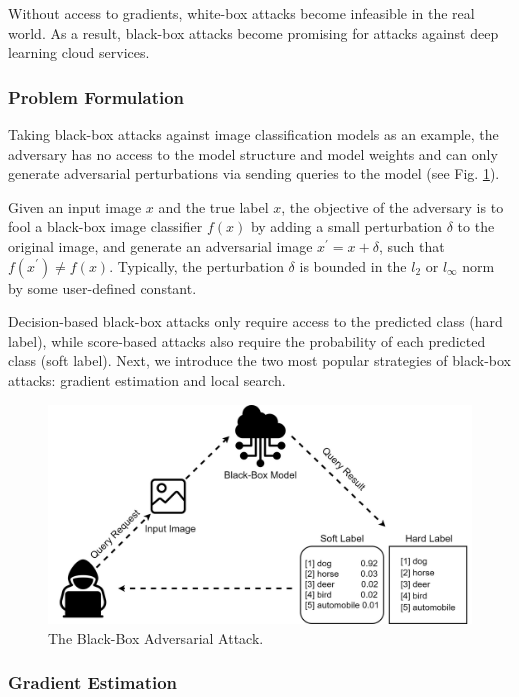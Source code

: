 Without access to gradients, white-box attacks become infeasible in the real world. As a result, black-box attacks become promising for attacks against deep learning cloud services.


\subsubsection{Problem Formulation}

Taking black-box attacks against image classification models as an example, the adversary has no access to the model structure and model weights and can only generate adversarial perturbations via sending queries to the model (see Fig. \ref{fig.decision}).
 
Given an input image $x$ and the true label $x$, the objective of the adversary is to fool a black-box image classifier $f(x)$ by adding a small perturbation $\delta$ to the original image, and generate an adversarial image $x^{'} = x + \delta$, such that $f(x^{'}) \neq f(x)$. Typically, the perturbation $\delta$ is bounded in the $l_2$ or $l_{\infty}$ norm by some user-defined constant.

Decision-based black-box attacks only require access to the predicted class (hard label), while score-based attacks also require the probability of each predicted class (soft label).  Next, we introduce the two most popular strategies of black-box attacks: gradient estimation and local search.

\begin{figure}[H]
\centering
\includegraphics[width=\textwidth]{figures/chapter_intro/black-box.jpg}
\caption{The Black-Box Adversarial Attack.}
\label{fig.decision}
\end{figure}

\clearpage

\subsubsection{Gradient Estimation}

